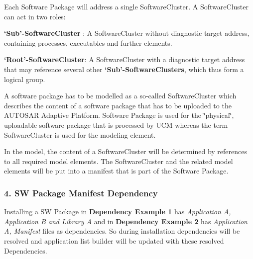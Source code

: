 Each Software Package will address a single Software\+Cluster. A Software\+Cluster can act in two roles\+: 
\begin{DoxyItemize}
\item {\bfseries ‘\+Sub’-\/\+Software\+Cluster} \+: A Software\+Cluster without diagnostic target address, containing processes, executables and further elements. 
\item {\bfseries ‘\+Root’-\/\+Software\+Cluster}\+: A Software\+Cluster with a diagnostic target address that may reference several other {\bfseries ‘\+Sub’-\/\+Software\+Clusters}, which thus form a logical group. 
\end{DoxyItemize}

A software package has to be modelled as a so-\/called Software\+Cluster which describes the content of a software package that has to be uploaded to the A\+U\+T\+O\+S\+AR Adaptive Platform. Software Package is used for the \char`\"{}physical\char`\"{}, uploadable software package that is processed by U\+CM whereas the term Software\+Cluster is used for the modeling element. 

In the model, the content of a Software\+Cluster will be determined by references to all required model elements. The Software\+Cluster and the related model elements will be put into a manifest that is part of the Software Package. 

\subsubsection*{4. SW Package Manifest Dependency}

Installing a SW Package in {\bfseries Dependency Example 1} has {\itshape Application A, Application B and Library A} and in {\bfseries Dependency Example 2} has {\itshape Application A, Manifest} files as dependencies. So during installation dependencies will be resolved and application list builder will be updated with these resolved Dependencies.

